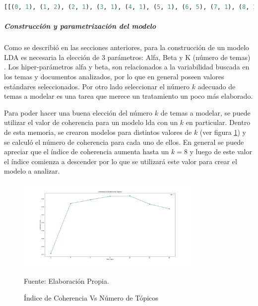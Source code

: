     \begin{lstlisting}[language=Python]
    [[(0, 1), (1, 2), (2, 1), (3, 1), (4, 1), (5, 1), (6, 5), (7, 1), (8, 1), (9, 2), (10, 1), (11, 1), (12, 1), (13, 1), (14, 1), (15, 1), (16, 1), (17, 1), (18, 1), (19, 1), (20, 1), (21, 1), (22, 2), (23, 1), (24, 1), (25, 1), (26, 1), (27, 1), (28, 1), (29, 1), (30, 1), (31, 1), (32, 1), (33, 1), (34, 1), (35, 1), (36, 1), (37, 1), (38, 1), (39, 1), (40, 1), (41, 1), (42, 1), (43, 1), (44, 1), (45, 1), (46, 1), (47, 1), (48, 1), (49, 1), (50, 1)]]
    \end{lstlisting}
    
    \subparagraph{Construcción y parametrización del  modelo}
    \subparagraph*{}
    
    Como se describió en las secciones anteriores, para la construcción de un modelo LDA es necesaria la elección de 3 parámetros: Alfa, Beta y K (número de temas) . Los hiper-parámetros alfa y beta, son relacionados a la variabilidad buscada en los temas y documentos analizados, por lo que en general poseen valores estándares seleccionados. Por otro lado seleccionar el número $k$ adecuado de temas a modelar es una tarea que merece un tratamiento un poco más elaborado. 
    
    Para poder hacer una buena elección del número $k$ de temas a modelar, se puede utilizar el valor de coherencia para un modelo lda con un $k$ en particular. Dentro de esta memoria, se crearon modelos para distintos valores de $k$ (ver figura \ref{fig:Coherence}) y se calculó el número de coherencia para cada uno de ellos. En general se puede apreciar que el índice de coherencia aumenta hasta un $k=8$ y luego de este valor el índice comienza a descender por lo que se utilizará este valor para crear el modelo a analizar.
    
    \begin{figure}[h!]
        \centering
        \includegraphics[width=0.8\textwidth]{figures/LDA/Coherence.png}
        \caption{\label{fig:Coherence} Índice de Coherencia Vs Número de Tópicos} Fuente: Elaboración Propia.
    \end{figure}
    
